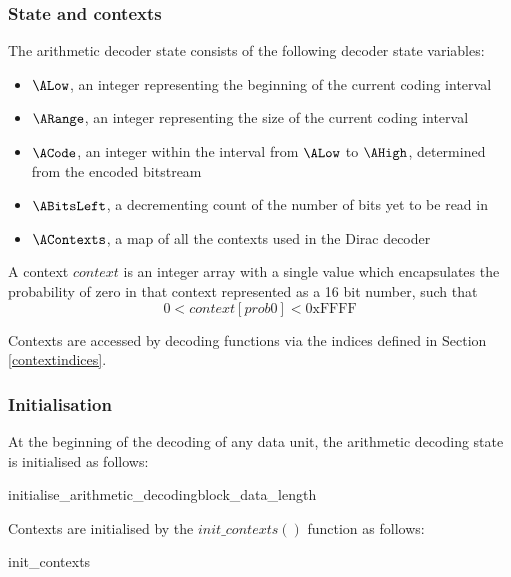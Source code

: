 \subsubsection{State and contexts}
\label{arithcontexts}

The arithmetic decoder state consists of the following decoder state variables:

\begin{itemize}
\item $\ALow$, an integer representing the beginning of the current coding interval
\item $\ARange$, an integer representing the size of the current coding interval
\item $\ACode$, an integer within the interval from $\ALow$ to $\AHigh$, determined from the encoded bitstream
\item $\ABitsLeft$, a decrementing count of the number of bits yet to be read in
\item $\AContexts$, a map of all the contexts used in the Dirac decoder
\end{itemize}

A context $context$ is an integer array with a single value which encapsulates
the probability of zero in that context represented as a 16 bit number, such that
\[0<context[prob0]<\text{0xFFFF}\]

Contexts are accessed by decoding functions via the indices defined in Section \ref{contextindices}. 

\subsubsection{Initialisation}
\label{initarith}

At the beginning of the decoding of any data unit, the arithmetic
decoding state is initialised as follows:

\begin{pseudo}{initialise\_arithmetic\_decoding}{block\_data\_length}
\bsEND
{}
\end{pseudo}

Contexts are initialised by the $init\_contexts()$ function as follows:

\begin{pseudo}{init\_contexts}{}
\bsEND
\end{pseudo}

